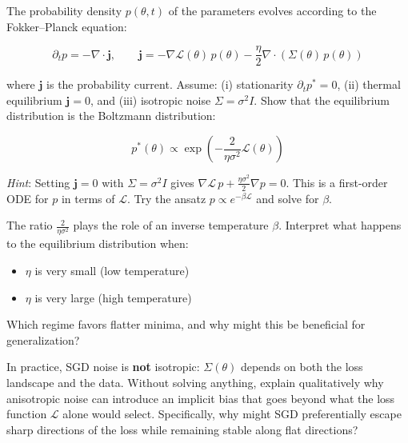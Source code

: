 \documentclass[11pt]{article}
\providecommand{\tightlist}{%
  \setlength{\itemsep}{0pt}\setlength{\parskip}{0pt}}
\begin{document}
\begin{exercise}
\label{ex:td-6a}
The probability density \(p(\theta, t)\) of the parameters
evolves according to the Fokker--Planck equation:

\[\partial_t p = -\nabla \cdot \mathbf{j}, \qquad \mathbf{j} = -\nabla \mathcal{L}(\theta)\,p(\theta) - \frac{\eta}{2}\nabla \cdot \left(\Sigma(\theta)\,p(\theta)\right)\]

where \(\mathbf{j}\) is the probability current. Assume: (i)
stationarity \(\partial_t p^* = 0\), (ii) thermal equilibrium
\(\mathbf{j} = 0\), and (iii) isotropic noise \(\Sigma = \sigma^2 I\).
Show that the equilibrium distribution is the Boltzmann distribution:

\[p^*(\theta) \propto \exp\left(-\frac{2}{\eta \sigma^2}\mathcal{L}(\theta)\right)\]

\emph{Hint}: Setting \(\mathbf{j} = 0\) with \(\Sigma = \sigma^2 I\)
gives \(\nabla \mathcal{L}\, p + \frac{\eta\sigma^2}{2}\nabla p = 0\).
This is a first-order ODE for \(p\) in terms of \(\mathcal{L}\). Try the
ansatz \(p \propto e^{-\beta \mathcal{L}}\) and solve for \(\beta\).
\end{exercise}


\begin{exercise}
\label{ex:td-6b}
The ratio \(\frac{2}{\eta \sigma^2}\) plays the role of an
inverse temperature \(\beta\). Interpret what happens to the equilibrium
distribution when:

\begin{itemize}
\tightlist
\item
  \(\eta\) is very small (low temperature)
\item
  \(\eta\) is very large (high temperature)
\end{itemize}

Which regime favors flatter minima, and why might this be beneficial for
generalization?
\end{exercise}


\begin{exercise}
\label{ex:td-6c}
In practice, SGD noise is \textbf{not} isotropic:
\(\Sigma(\theta)\) depends on both the loss landscape and the data.
Without solving anything, explain qualitatively why anisotropic noise
can introduce an implicit bias that goes beyond what the loss function
\(\mathcal{L}\) alone would select. Specifically, why might SGD
preferentially escape sharp directions of the loss while remaining
stable along flat directions?
\end{exercise}
\end{document}
